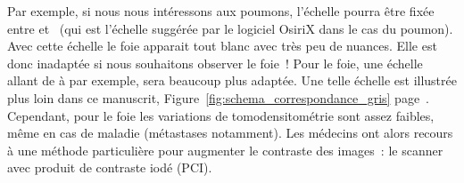 \documentclass[main.tex]{subfiles}
\begin{document}
Par exemple, si nous nous intéressons aux poumons, l'échelle pourra être fixée entre  et~ (qui est l'échelle suggérée par le logiciel OsiriX dans le cas du poumon). Avec cette échelle le foie apparait tout blanc avec très peu de nuances. Elle est donc inadaptée si nous  souhaitons observer le foie~! Pour le foie, une échelle allant de  à  par exemple, sera beaucoup plus adaptée. 
Une telle échelle est illustrée plus loin dans ce manuscrit, \cf Figure~\ref{fig:schema_correspondance_gris} page~\pageref{fig:schema_correspondance_gris}.
Cependant, pour le foie les variations de tomodensitométrie sont assez faibles, même en cas de maladie (métastases notamment). Les médecins ont alors recours à une méthode particulière pour augmenter le contraste des images~: le scanner avec produit de contraste iodé (PCI).
\end{document}
